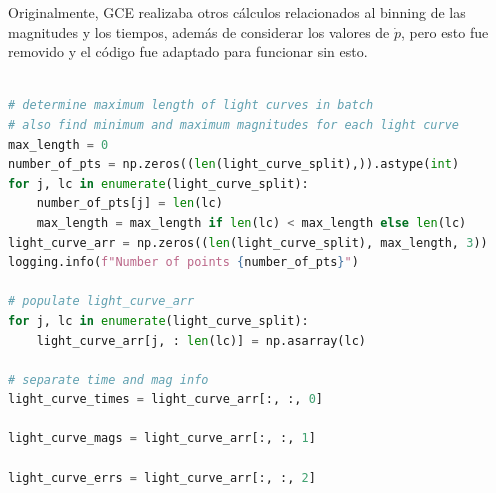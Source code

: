 Originalmente, GCE realizaba otros cálculos relacionados al binning de las magnitudes y los tiempos, además de considerar los valores de $\dot p$, pero esto fue removido y el código fue adaptado para funcionar sin esto.
\begin{lstlisting}[language=Python]

# determine maximum length of light curves in batch
# also find minimum and maximum magnitudes for each light curve
max_length = 0
number_of_pts = np.zeros((len(light_curve_split),)).astype(int)
for j, lc in enumerate(light_curve_split):
    number_of_pts[j] = len(lc)
    max_length = max_length if len(lc) < max_length else len(lc)
light_curve_arr = np.zeros((len(light_curve_split), max_length, 3))
logging.info(f"Number of points {number_of_pts}")

# populate light_curve_arr
for j, lc in enumerate(light_curve_split):
    light_curve_arr[j, : len(lc)] = np.asarray(lc)

# separate time and mag info
light_curve_times = light_curve_arr[:, :, 0]

light_curve_mags = light_curve_arr[:, :, 1]

light_curve_errs = light_curve_arr[:, :, 2]
\end{lstlisting}

